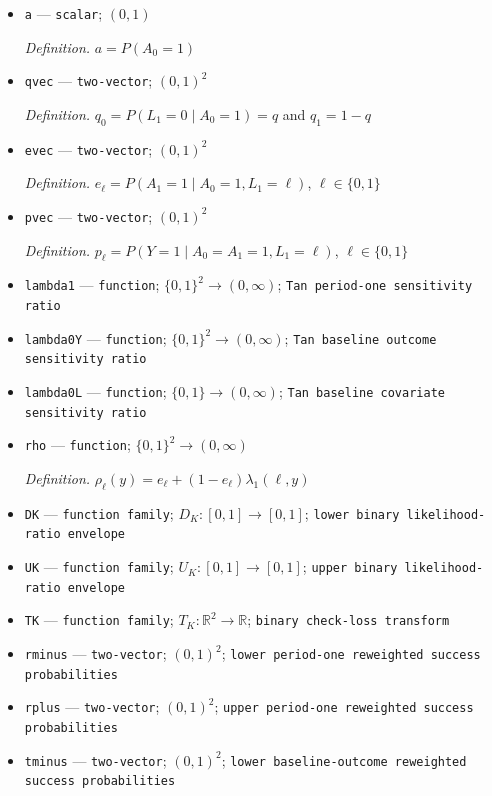 \documentclass{article}
\begin{document}
\begin{itemize}
  \item \texttt{a} --- \texttt{scalar}; \((0,1)\)
  \par\smallskip\noindent\emph{Definition.} \(a=P(A_0=1)\)
  \item \texttt{qvec} --- \texttt{two-\allowbreak{}vector}; \((0,1)^2\)
  \par\smallskip\noindent\emph{Definition.} \(q_0=P(L_1=0\mid A_0=1)=q\) and \(q_1=1-q\)
  \item \texttt{evec} --- \texttt{two-\allowbreak{}vector}; \((0,1)^2\)
  \par\smallskip\noindent\emph{Definition.} \(e_\ell=P(A_1=1\mid A_0=1,L_1=\ell)\), \(\ell\in\{0,1\}\)
  \item \texttt{pvec} --- \texttt{two-\allowbreak{}vector}; \((0,1)^2\)
  \par\smallskip\noindent\emph{Definition.} \(p_\ell=P(Y=1\mid A_0=A_1=1,L_1=\ell)\), \(\ell\in\{0,1\}\)
  \item \texttt{lambda1} --- \texttt{function}; \(\{0,1\}^2\to(0,\infty)\); \texttt{Tan period-\allowbreak{}one sensitivity ratio}
  \item \texttt{lambda0Y} --- \texttt{function}; \(\{0,1\}^2\to(0,\infty)\); \texttt{Tan baseline outcome sensitivity ratio}
  \item \texttt{lambda0L} --- \texttt{function}; \(\{0,1\}\to(0,\infty)\); \texttt{Tan baseline covariate sensitivity ratio}
  \item \texttt{rho} --- \texttt{function}; \(\{0,1\}^2\to(0,\infty)\)
  \par\smallskip\noindent\emph{Definition.} \(\rho_\ell(y)=e_\ell+(1-e_\ell)\lambda_1(\ell,y)\)
  \item \texttt{DK} --- \texttt{function family}; \(D_K:[0,1]\to[0,1]\); \texttt{lower binary likelihood-\allowbreak{}ratio envelope}
  \item \texttt{UK} --- \texttt{function family}; \(U_K:[0,1]\to[0,1]\); \texttt{upper binary likelihood-\allowbreak{}ratio envelope}
  \item \texttt{TK} --- \texttt{function family}; \(T_K:\mathbb R^2\to\mathbb R\); \texttt{binary check-\allowbreak{}loss transform}
  \item \texttt{rminus} --- \texttt{two-\allowbreak{}vector}; \((0,1)^2\); \texttt{lower period-\allowbreak{}one reweighted success probabilities}
  \item \texttt{rplus} --- \texttt{two-\allowbreak{}vector}; \((0,1)^2\); \texttt{upper period-\allowbreak{}one reweighted success probabilities}
  \item \texttt{tminus} --- \texttt{two-\allowbreak{}vector}; \((0,1)^2\); \texttt{lower baseline-\allowbreak{}outcome reweighted success probabilities}

\end{itemize}
\end{document}
